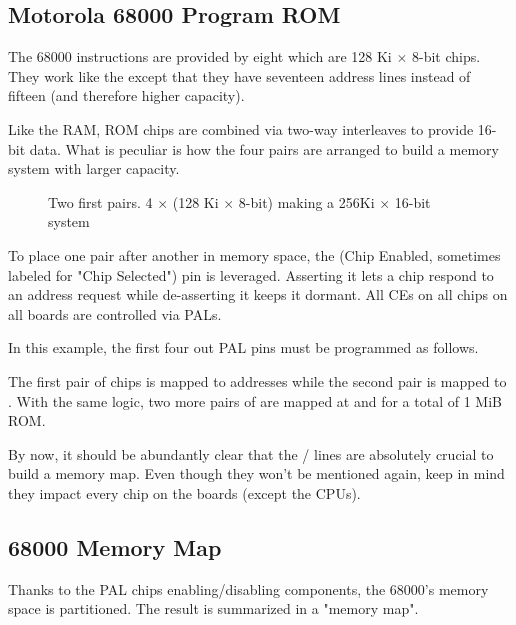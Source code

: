 \subsection{Motorola 68000 Program ROM}


The 68000 instructions are provided by eight  which are 128 Ki $\times$ 8-bit chips. They work like the  except that they have seventeen address lines instead of fifteen (and therefore higher capacity).

Like the RAM, ROM chips are combined via two-way interleaves to provide 16-bit data. What is peculiar is how the four pairs are arranged to build a memory system with larger capacity.


\begin{figure}[H]
\caption*{Two first pairs. 4 $\times$ (128 Ki $\times$ 8-bit) making a 256Ki $\times$ 16-bit system}
\end{figure}

To place one pair after another in memory space, the  (Chip Enabled, sometimes labeled  for "Chip Selected") pin is leveraged. Asserting it lets a chip respond to an address request while de-asserting it keeps it dormant. All CEs on all chips on all boards are controlled via PALs.

In this example, the first four out PAL pins must be programmed as follows.




The first pair of chips is mapped to addresses  while the second pair is mapped to . With the same logic, two more pairs of  are mapped at  and  for a total of 1 MiB ROM.



By now, it should be abundantly clear that the  /  lines are absolutely crucial to build a memory map. Even though they won't be mentioned again, keep in mind they impact every chip on the boards (except the CPUs).

\subsection{68000 Memory Map}

Thanks to the PAL chips enabling/disabling components, the 68000's memory space is partitioned. The result is summarized in a "memory map".

